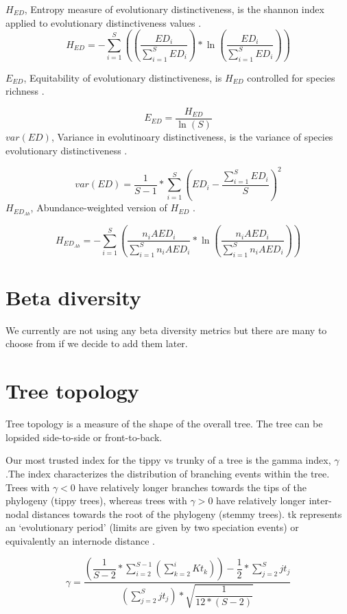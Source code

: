 \documentclass[]{book}
\theoremstyle{definition}
\theoremstyle{definition}
\theoremstyle{definition}
\theoremstyle{remark}
\begin{document}
\(H_{ED}\), Entropy measure of evolutionary distinctiveness, is the
shannon index applied to evolutionary distinctiveness values
\citep{Cadotte2010}. \[
H_{ED} = -\sum_{i=1}^{S}
((\dfrac{ED_{i}}{\sum_{i=1}^{S} ED_{i}})
* \ln (\dfrac{ED_{i}}{\sum_{i=1}^{S} ED_{i}}))
\]

\(E_{ED}\), Equitability of evolutionary distinctiveness, is \(H_{ED}\)
controlled for species richness \citep{Cadotte2010}.

\[
E_{ED} = \dfrac{H_{ED}}{\ln(S)}
\] \(var(ED)\), Variance in evolutinoary distinctiveness, is the
variance of species evolutionary distinctiveness \citep{Tucker2016}.

\[
var(ED) = \dfrac{1}{S-1} *
\sum_{i=1}^{S}
(ED_{i}-\dfrac{\sum_{i=1}^{S} ED_{i}}{S})^2
\] \(H_{ED_{Ab}}\), Abundance-weighted version of \(H_{ED}\)
\citep{Cadotte2010}.

\[
H_{ED_{Ab}} = -\sum_{i=1}^{S}
(\dfrac{n_{i}AED_{i}}{\sum_{i=1}^{S} n_{i}AED_{i}} *
\ln(\dfrac{n_{i}AED_{i}}{\sum_{i=1}^{S} n_{i}AED_{i}}))
\]

\hypertarget{beta-diversity}{\section{Beta
diversity}\label{beta-diversity}}

We currently are not using any beta diversity metrics but there are many
to choose from if we decide to add them later.

\hypertarget{tree-topology}{\section{Tree
topology}\label{tree-topology}}

Tree topology is a measure of the shape of the overall tree. The tree
can be lopsided side-to-side or front-to-back.

Our most trusted index for the tippy vs trunky of a tree is the gamma
index, \(\gamma\).The index characterizes the distribution of branching
events within the tree. Trees with \(\gamma < 0\) have relatively longer
branches towards the tips of the phylogeny (tippy trees), whereas trees
with \(\gamma > 0\) have relatively longer inter-nodal distances towards
the root of the phylogeny (stemmy trees). tk represents an `evolutionary
period' (limits are given by two speciation events) or equivalently an
internode distance \citep{Pybus2000}.

\[
  \gamma = \dfrac
  {(\dfrac{1}{S-2}* \sum_{i=2}^{S-1} (\sum_{k=2}^{i} Kt_{k}))- \dfrac{1}{2} * \sum_{j=2}^{S} jt_{j}}
  {(\sum_{j=2}^{S} jt_{j}) * \sqrt{\dfrac{1}{12*(S-2)}}}
\]
\end{document}
